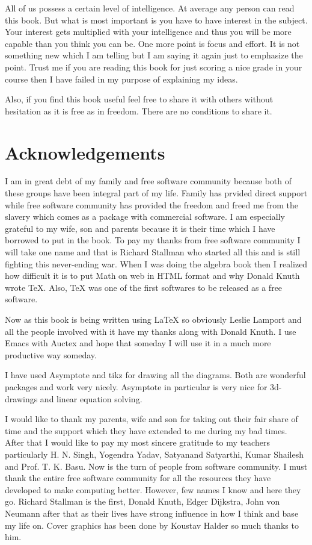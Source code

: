 All of us possess a certain level of intelligence. At average any person can read this book. But what is most important is you have
to have interest in the subject. Your interest gets multiplied with your intelligence and thus you will be more capable than you
think you can be. One more point is focus and effort. It is not something new which I am telling but I am saying it again just to
emphasize the point. Trust me if you are reading this book for just scoring a nice grade in your course then I have failed in my
purpose of explaining my ideas.

Also, if you find this book useful feel free to share it with others without hesitation as it is free as in freedom. There are no
conditions to share it.

\section*{Acknowledgements}
I am in great debt of my family and free software community because both of
these groups have been integral part of my life. Family has prvided direct
support while free software community has provided the freedom and freed me
from the slavery which comes as a package with commercial software. I am
especially grateful to my wife, son and parents because it is their time which
I have borrowed to put in the book. To pay my thanks from free software
community  I will take one name and that is Richard Stallman who started all
this  and is still fighting this never-ending war. When I was doing the algebra
book then I realized how difficult it is to put Math on web in HTML format and
why Donald Knuth wrote \TeX{}. Also, \TeX{} was one of the first softwares to
be released as a free software.

Now as this book is being written using \LaTeX{} so obviously Leslie Lamport
and all the people involved with it have my thanks along with Donald Knuth. I
use Emacs with Auctex and hope that someday I will use it in a much more
productive way someday.

I have used Asymptote and tikz for drawing all the diagrams. Both are wonderful
packages and work very nicely. Asymptote in particular is very nice for 3d-drawings and linear equation solving.

I would like to thank my parents, wife and son for taking out their fair share
of time and the support which they have extended to me during my bad
times. After that I would like to pay my most sincere gratitude to my teachers
particularly H. N. Singh, Yogendra Yadav, Satyanand Satyarthi, Kumar Shailesh
and Prof. T. K. Basu. Now is the turn of people from software community. I must
thank the entire free software community for all the resources they have
developed to make computing better. However, few names I know and here they
go. Richard Stallman is the first, Donald Knuth, Edger Dijkstra, John von Neumann after that as their lives have strong influence in
how I think and base my life on. Cover graphics has been done by Koustav Halder so much thanks to him.


